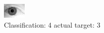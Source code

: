 \begin{figure}[h!]
\begin{center}
\includegraphics[width=0.60\columnwidth]{figures/ID2111_class_4_target_3.png}
\end{center}
\caption{ Classification: 4 actual target: 3}
\label{fig:ID2111_class_4_target_3}
\end{figure}

